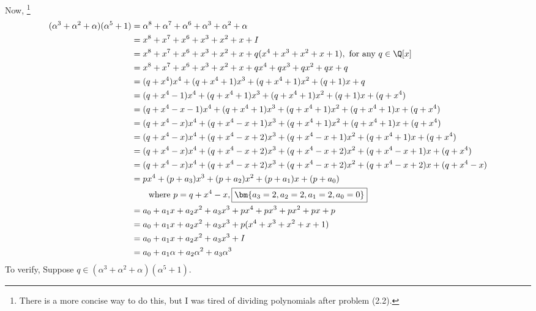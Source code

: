         Now, 
        \footnote{There is a more concise way to do this, 
            but I was tired of dividing polynomials after problem (2.2).}
        \begin{align*}
            (\alpha^3 + \alpha ^2 + \alpha)(\alpha^5 + 1)
            &= \alpha^8 + \alpha ^7 + \alpha^6 + \alpha^3 + \alpha ^2 + \alpha \\
            &= x^8 + x^7 + x^6 + x^3 + x^2 + x + I \\
            &= x^8 + x^7 + x^6 + x^3 + x^2 + x + q(x^4 + x^3 + x^2 + x+1), \text{ for any } q\in \Q[x] \\
            &= x^8 + x^7 + x^6 + x^3 + x^2 + x + qx^4 + qx^3 + qx^2 + qx + q \\
            &= (q+x^4)x^4 + (q+x^4 + 1)x^3 + (q+x^4+1)x^2 + (q + 1)x + q \\
            &= (q+x^4 - 1)x^4 + (q+x^4 + 1)x^3 + (q+x^4+1)x^2 + (q + 1)x + (q + x^4)\\
            &= (q+x^4 - x - 1)x^4 + (q+x^4 + 1)x^3 + (q+x^4+1)x^2 + (q + x^4 + 1)x + (q + x^4)\\
            &= (q+x^4 - x)x^4 + (q+x^4 - x + 1)x^3 + (q+x^4+1)x^2 + (q + x^4 + 1)x + (q + x^4)\\
            &= (q+x^4 - x)x^4 + (q+x^4 - x + 2)x^3 + (q+x^4 - x+1)x^2 + (q + x^4 + 1)x + (q + x^4)\\
            &= (q+x^4 - x)x^4 + (q+x^4 - x + 2)x^3 + (q+x^4 - x+2)x^2 + (q + x^4 -x + 1)x + (q + x^4)\\
            &= (q+x^4 - x)x^4 + (q+x^4 - x + 2)x^3 + (q+x^4 - x+2)x^2 + (q + x^4 -x + 2)x + (q + x^4 -x)\\
            &= px^4 + (p+a_3)x^3 + (p+a_2)x^2 + (p+a_1)x+(p + a_0) \\
            &\ \ \ \ \ \ \text{where }  
                p = q + x^4 - x, 
                \fbox{$\bm{ 
                    a_3 = 2, 
                    a_2 = 2,
                    a_1 = 2,
                    a_0 = 0
                }$}
                \\
            &= a_0 + a_1x +a_2x^2+a_3x^3 + px^4 + px^3 + px^2 + px+p \\
            &= a_0 + a_1x +a_2x^2+a_3x^3 + p(x^4 + x^3 + x^2 + x+1) \\
            &= a_0 + a_1x +a_2x^2+a_3x^3 + I \\
            &= a_0+a_1\alpha +a_2\alpha^2+a_3\alpha^3 
        \end{align*}
        To verify,
        Suppose $q \in (\alpha^3 + \alpha ^2 + \alpha)(\alpha^5 + 1)$.

